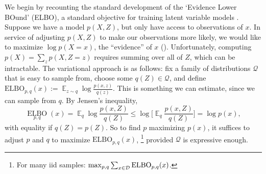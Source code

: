 \documentclass[twoside]{article}
\theoremstyle{plain}
\theoremstyle{definition}
\DeclareMathOperator*{\Ex}{\mathbb{E}} %
\newcommand{\thickD}{I\mkern-8muD}
\newcommand{\kldiv}{\thickD\infdivx}
\begin{document}
We begin by recounting the standard development of the `Evidence Lower BOund' (ELBO), a standard objective for training latent variable models \parencite[\S2.2]{blei2017variational}.
%
Suppose we have a model $p(X,Z)$, but only have access to observations of $x$.
In service of adjusting $p(X,Z)$ to make our observations more likely, we would like to maximize $\log p(X\!\!=\!x)$, the ``evidence'' of $x$ ().
Unfortunately, computing $p(X) = \sum_z p(X,Z\!\!=\!z)$ requires summing over all of $Z$, which can be intractable.
%
The variational approach is as follows: fix a family of distributions $\mathcal Q$ that is easy to sample from, choose some $q(Z) \in \mathcal Q$, and define
$\mathrm{ELBO}_{p,q}(x) := \Ex_{z \sim q} \log \frac{p(x,z)}{q(z)}$.
This is something we can estimate, since we can sample from $q$. By Jensen's inequality,
\[
    \mathop{\mathrm{ELBO}}\limits_{p,q}(x)
    =\! \Ex_{q} \log \frac{p(x,Z)}{q(Z)}
    \le  \log \Big[\! \Ex_{q}\! \frac{p(x,Z)}{q(Z)} \Big]\!
    = \log p(x),
\]
with equality if $q(Z) = p(Z)$.
So to find $p$ maximizing $p(x)$, it suffices to adjust $p$ and $q$ to maximize $\mathrm{ELBO}_{p,q}(x)$,%
    \footnote{For many iid samples: $\max_{p,q}\sum_{x \in {\mathcal D}}\mathrm{ELBO}_{p,q}(x)$.}
 provided $\mathcal Q$ is expressive enough.
\end{document}
